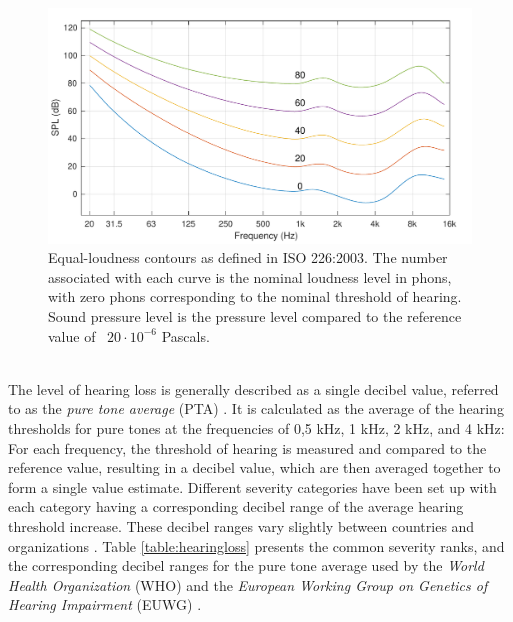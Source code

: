 \documentclass[english, 12pt, a4paper, pdftex, elec, utf8]{aaltothesis}
\begin{document}
\begin{figure}[]
	\centering 
	\includegraphics[width=\textwidth]{loudness.pdf}
	\caption{Equal-loudness contours as defined in ISO 226:2003. The number associated with each curve is the nominal loudness level in phons, with zero phons corresponding to the nominal threshold of hearing. Sound pressure level is the pressure level compared to the reference value of \ $ \mathit{20 \cdot 10^{-6}}$ Pascals. \cite{iso226}}
	\label{fig:loudness} 
\end{figure} \\
The level of hearing loss is generally described as a single decibel value, referred to as the \textit{pure tone average} (PTA) \cite{moore2007cochlear, salonen2013hearing}. It is calculated as the average of the hearing thresholds for pure tones at the frequencies of 0,5 kHz, 1 kHz, 2 kHz, and 4 kHz: For each frequency, the threshold of hearing is measured and compared to the reference value, resulting in a decibel value, which are then averaged together to form a single value estimate. Different severity categories have been set up with each category having a corresponding decibel range of the average hearing threshold increase. These decibel ranges vary slightly between countries and organizations \cite{salonen2013hearing}. Table \ref{table:hearingloss} presents the common severity ranks, and the corresponding decibel ranges for the pure tone average used by the \textit{World Health Organization} (WHO) and the \textit{European Working Group on Genetics of Hearing Impairment} (EUWG) \cite{salonen2013hearing}. \\\\
\end{document}
